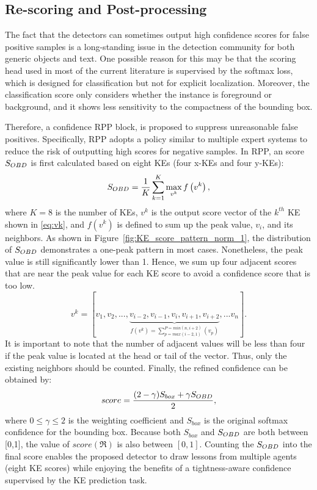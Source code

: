 \subsection{Re-scoring and Post-processing}


The fact that the detectors can sometimes output high confidence scores for false positive samples is a long-standing issue in the detection community for both generic objects and text. One possible reason for this may be that the scoring head used in most of the current literature is supervised by the softmax loss, which is designed for classification but not for explicit localization. Moreover, the classification score only considers whether the instance is foreground or background, and it shows less sensitivity to the compactness of the bounding box.

Therefore, a confidence RPP block, is proposed to suppress unreasonable false positives. Specifically, RPP adopts a policy similar to multiple expert systems to reduce the risk of outputting high scores for negative samples. In RPP, an \Ours score $S_{{OBD}}$ is first calculated based on eight KEs (four x-KEs and four y-KEs):
\begin{equation}
	S_{   {OBD}  } = \frac{1}{K} \sum_{k=1}^{K} \max _{v^{k}} f\left(v^{k}\right),
	\label{eq:score}
\end{equation}
\noindent where $K = 8$ is the number of KEs, $v^{k}$ is the output score vector of the $k^{th}$ KE shown in \eqref{eq:vk}, and $f(v^{k})$ is defined to sum up the peak value, $v_{i}$, and its neighbors.
As shown in Figure~\ref{fig:KE_score_pattern_norm_1}, the distribution of $S_{{OBD}}$ demonstrates a one-peak pattern in most cases. Nonetheless, the peak value is still significantly lower than 1. Hence, we sum up four adjacent scores that are near the peak value for each KE score to avoid a confidence score that is too low. 
\begin{equation}
\label{eq:vk}
	v^{k} = [v_{1}, v_{2}, ..., \underbrace{v_{i-2}, v_{i-1}, v_{i}, v_{i+1}, v_{i+2}}_{f(v^{k}) = \sum_{p=max(i-2, 1)}^{P=min(n, i+2)}(v_{p})}, ... v_{n}].
\end{equation}
\noindent It is important to note that the number of adjacent values will be less than four if the peak value is located at the head or tail of the vector. Thus, only the existing neighbors should be counted. Finally, the refined confidence can be obtained by:
\begin{equation}
score=\frac{(2-\gamma) S_{b o x}+\gamma S_{   {OBD}  }}{2}, 
\label{eq:rpp_block}
\end{equation}
\noindent where $ 0 \leq \gamma \leq 2$ is the weighting coefficient and $S_{box}$ is the original softmax confidence for the bounding box.
Because both $S_{box}$ and $S_{{OBD}}$ are both between [0,1], the value of $score(\Re)$ is also between $ [0,1] $. Counting the $S_{   {OBD}  }$ into the final score enables the proposed detector to draw lessons from multiple agents (eight KE scores) while enjoying the benefits of a tightness-aware confidence supervised by the KE prediction task.

